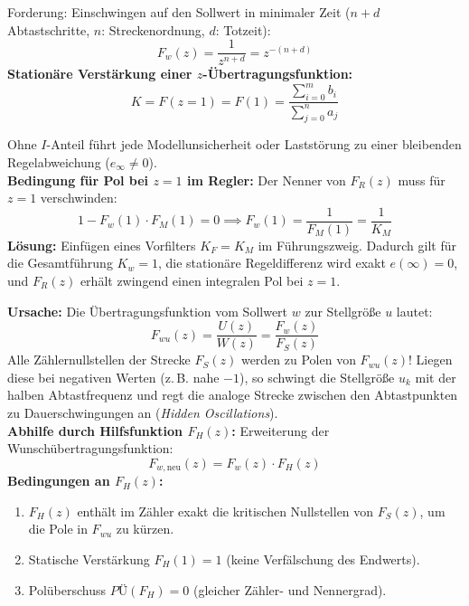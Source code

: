 \begin{tcolorbox}
Forderung: Einschwingen auf den Sollwert in minimaler Zeit ($n + d$ Abtastschritte, $n$: Streckenordnung, $d$: Totzeit):
\[
F_w(z) = \frac{1}{z^{n+d}} = z^{-(n+d)}
\]
\textbf{Stationäre Verstärkung einer $z$-Übertragungsfunktion:}
\[
K = F(z = 1) = F(1) = \frac{\sum_{i=0}^m b_i}{\sum_{j=0}^n a_j}
\]
\end{tcolorbox}

\begin{tcolorbox}
Ohne $I$-Anteil führt jede Modellunsicherheit oder Laststörung zu einer bleibenden Regelabweichung ($e_\infty \ne 0$).\\[3pt]
\textbf{Bedingung für Pol bei $z = 1$ im Regler:}
Der Nenner von $F_R(z)$ muss für $z = 1$ verschwinden:
\[
1 - F_w(1) \cdot F_M(1) = 0 \implies F_w(1) = \frac{1}{F_M(1)} = \frac{1}{K_M}
\]
\textbf{Lösung:} Einfügen eines Vorfilters $K_F = K_M$ im Führungszweig. Dadurch gilt für die Gesamtführung $K_w = 1$, die stationäre Regeldifferenz wird exakt $e(\infty) = 0$, und $F_R(z)$ erhält zwingend einen integralen Pol bei $z = 1$.
\end{tcolorbox}

\begin{tcolorbox}
\textbf{Ursache:} Die Übertragungsfunktion vom Sollwert $w$ zur Stellgröße $u$ lautet:
\[
F_{wu}(z) = \frac{U(z)}{W(z)} = \frac{F_w(z)}{F_S(z)}
\]
Alle Zählernullstellen der Strecke $F_S(z)$ werden zu Polen von $F_{wu}(z)$! Liegen diese bei negativen Werten (z.\,B. nahe $-1$), so schwingt die Stellgröße $u_k$ mit der halben Abtastfrequenz und regt die analoge Strecke zwischen den Abtastpunkten zu Dauerschwingungen an (\textit{Hidden Oscillations}).\\[3pt]
\textbf{Abhilfe durch Hilfsfunktion $F_H(z)$:}
Erweiterung der Wunschübertragungsfunktion:
\[
F_{w,\text{neu}}(z) = F_w(z) \cdot F_H(z)
\]
\textbf{Bedingungen an $F_H(z)$:}
\begin{enumerate}
  \item $F_H(z)$ enthält im Zähler exakt die kritischen Nullstellen von $F_S(z)$, um die Pole in $F_{wu}$ zu kürzen.
  \item Statische Verstärkung $F_H(1) = 1$ (keine Verfälschung des Endwerts).
  \item Polüberschuss $PÜ(F_H) = 0$ (gleicher Zähler- und Nennergrad).
\end{enumerate}
\end{tcolorbox}


